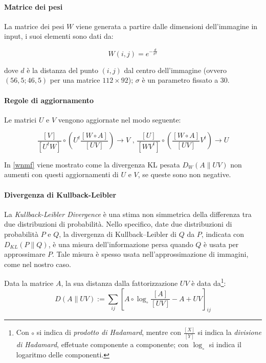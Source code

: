 \documentclass[a4paper]{article} %
\begin{document}

\paragraph{Matrice dei pesi}\label{W}
La matrice dei pesi $W$ viene generata a partire dalle dimensioni dell'immagine in input, i suoi elementi sono dati da:

\[ W(i,j) = e^{-\frac{d}{\sigma^2}} \]

dove $d$ è la distanza del punto $(i,j)$ dal centro dell'immagine (ovvero $(56,5 ; 46,5)$ per una matrice $112 \times 92$); $\sigma$ è un parametro fissato a $30$.

\paragraph{Regole di aggiornamento}\label{updaterules}
Le matrici $U$ e $V$ vengono aggiornate nel modo seguente:

\[ \frac{[V]}{[U^tW]} \circ \left( U^t \frac{[W \circ A]}{[UV]} \right) \rightarrow V \text{ , } \frac{[U]}{[WV^t]} \circ \left( \frac{[W \circ A]}{[UV]}V^t \right) \rightarrow U \]

\vspace{5mm}
In \ref{wnmf} viene mostrato come la divergenza KL pesata $D_W(A\lVert UV)$ non aumenti con questi aggiornamenti di $U$ e $V$, se queste sono non negative.

\paragraph{Divergenza di Kullback-Leibler}\label{KL-div}
La \emph{Kullback-Leibler Divergence} è una stima non simmetrica della differenza tra due distribuzioni di probabilità. Nello specifico, date due distribuzioni di probabilità $P$ e $Q$, la divergenza di Kullback–Leibler di $Q$ da $P$, indicata con $D_{KL}(P \lVert Q)$, è una misura dell'informazione persa quando $Q$ è usata per approssimare $P$. Tale misura è spesso usata nell'approssimazione di immagini, come nel nostro caso.

Data la matrice $A$, la sua distanza dalla fattorizzazione $UV$ è data da\footnote{Con $\circ$ si indica di \emph{prodotto di Hadamard}, mentre con $\frac{[X]}{[Y]}$ si indica la \emph{divisione di Hadamard}, effetuate componente a componente; con $\log_{\circ}$ si indica il logaritmo delle componenti.}:
\[ D(A \lVert UV) := \sum_{ij} \left[ A \circ \log_{\circ} \frac{[A]}{[UV]} - A + UV \right]_{ij} \]
\end{document}
